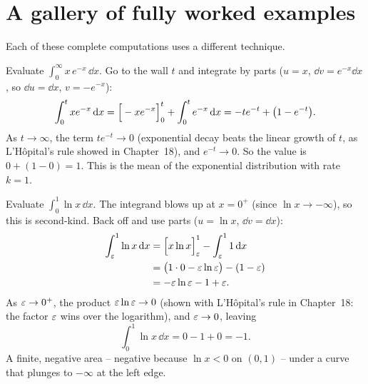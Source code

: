 \section{A gallery of fully worked examples}
\label{ch25:gallery}

Each of these complete computations uses a different technique.

\begin{example}
\label{ch25:ex-parts}
Evaluate $\displaystyle\int_0^{\infty} x\,e^{-x}\,\dd x$. Go to the wall $t$ and
integrate by parts ($u = x$, $\dd v = e^{-x}\dd x$, so $\dd u = \dd x$,
$v = -e^{-x}$):
\[
  \int_0^{t} x e^{-x}\,\mathrm{d} x
  = \Big[-x e^{-x}\Big]_{0}^{t} + \int_0^{t} e^{-x}\,\mathrm{d} x
  = -t e^{-t} + \bigl(1 - e^{-t}\bigr).
\]
As $t\to\infty$, the term $t e^{-t}\to 0$ (exponential decay beats the linear
growth of $t$, as L'H\^opital's rule showed in Chapter~18), and $e^{-t}\to 0$.
So the value is $0 + (1 - 0) = 1$. This is the mean of the exponential
distribution with rate $k=1$.
\end{example}

\begin{example}
\label{ch25:ex-logspike}
Evaluate $\displaystyle\int_0^{1} \ln x \, \dd x$. The integrand blows up at
$x=0^+$ (since $\ln x \to -\infty$), so this is second-kind. Back off and use parts
($u=\ln x$, $\dd v = \dd x$):
\begin{align*}
  \int_{\varepsilon}^{1}\ln x\,\mathrm{d} x
  &= \Big[x\ln x\Big]_{\varepsilon}^{1} - \int_{\varepsilon}^{1} 1\,\mathrm{d} x\\
  &= \bigl(1\cdot 0 - \varepsilon\ln\varepsilon\bigr) - (1 - \varepsilon)\\
  &= -\varepsilon\ln\varepsilon - 1 + \varepsilon.
\end{align*}
As $\varepsilon\to 0^+$, the product $\varepsilon\ln\varepsilon\to 0$ (shown with L'H\^opital's rule in
Chapter~18: the factor $\varepsilon$ wins over the logarithm), and $\varepsilon\to 0$, leaving
\[
  \int_0^{1}\ln x\,\dd x = 0 - 1 + 0 = -1.
\]
A finite, negative area -- negative because $\ln x < 0$ on $(0,1)$ -- under a curve
that plunges to $-\infty$ at the left edge.
\end{example}


